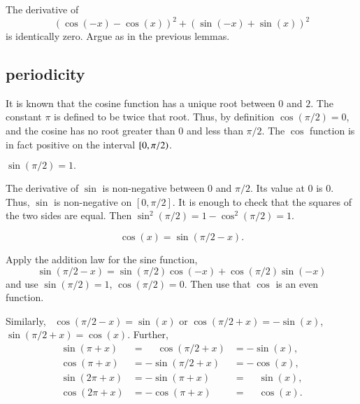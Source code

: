 \begin{proved}
The derivative of
    $$(\cos(-x) - \cos(x))^2 + (\sin(-x) +\sin(x))^2$$
is identically zero.  Argue as in the previous lemmas.
\swallowed\end{proved}

\subsection{periodicity}
\label{sec:pi}

It is known that the cosine function has a unique root between $0$
and $2$. The constant $\pi$ is defined to be twice that root.  Thus, by
definition $\cos(\pi/2) = 0$, and the cosine has no root greater
than $0$ and less than $\pi/2$. The $\cos$ function is in fact
positive on the interval $[ 0,\pi/2)$.

\begin{lemma}\label{lemma:sin-pi2}
    $\sin (\pi/2) = 1.$
\end{lemma}

\begin{proved}
The derivative of $\sin$ is non-negative between $0$ and $\pi/2$.
Its value at $0$ is $0$.  Thus, $\sin$ is non-negative on
$[0,\pi/2]$.  It is enough to check
that the squares of the two sides are equal. Then $\sin^2(\pi/2) =
{1-\cos^2(\pi/2)} = 1$.
\swallowed\end{proved}

\begin{lemma}\label{lemma:cos-sin}
    $$\cos(x) = \sin(\pi/2 - x).$$
\end{lemma}

\begin{proved}
    Apply the addition law for the sine function,
    $$\sin(\pi/2 - x) = \sin(\pi/2)\cos(-x) + \cos(\pi/2)\sin(-x)$$
    and use
    $\sin(\pi/2) = 1$, $\cos(\pi/2) = 0$.  Then use that $\cos$ is
    an even function.
\swallowed\end{proved}

Similarly,~%
%
$\cos(\pi/2 - x) = \sin(x)$ or $\cos(\pi/2 + x) =
-\sin(x)$, $\sin(\pi/2 + x) = \cos(x)$.  Further,
    $$\begin{array}{lll}
      \sin(\pi + x) &= \phantom{-}\cos(\pi/2 + x) &= -\sin(x),\\
      \cos(\pi + x) &= -\sin(\pi/2 + x) &= -\cos(x),\\
      \sin(2\pi + x) &= -\sin(\pi + x) &= \phantom{-}\sin(x),\\
      \cos(2\pi + x) &= -\cos(\pi + x) &= \phantom{-}\cos(x).
      \end{array}$$


